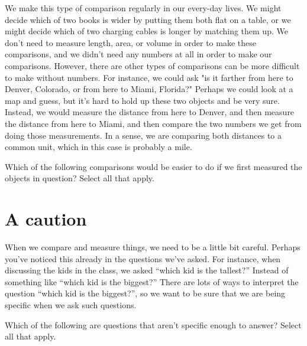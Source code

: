 \documentclass{ximera}
\begin{document}
We make this type of comparison regularly in our every-day lives. We might decide which of two books is wider by putting them both flat on a table, or we might decide which of two charging cables is longer by matching them up. We don't need to measure length, area, or volume in order to make these comparisons, and we didn't need any numbers at all in order to make our comparisons. However, there are other types of comparisons can be more difficult to make without numbers. For instance, we could ask "is it farther from here to Denver, Colorado, or from here to Miami, Florida?" Perhaps we could look at a map and guess, but it's hard to hold up these two objects and be very sure. Instead, we would measure the distance from here to Denver, and then measure the distance from here to Miami, and then compare the two numbers we get from doing those measurements. In a sense, we are comparing both distances to a common unit, which in this case is probably a mile.

\begin{question}
Which of the following comparisons would be easier to do if we first measured the objects in question? Select all that apply.
\begin{selectAll}
\end{selectAll}
\end{question}

\section{A caution}
When we compare and measure things, we need to be a little bit careful. Perhaps you've noticed this already in the questions we've asked. For instance, when discussing the kids in the class, we asked ``which kid is the tallest?'' Instead of something like ``which kid is the biggest?'' There are lots of ways to interpret the question ``which kid is the biggest?'', so we want to be sure that we are being specific when we ask such questions.

\begin{question}
Which of the following are questions that aren't specific enough to answer? Select all that apply.
\begin{selectAll}
\end{selectAll}
\end{question}
\end{document}
